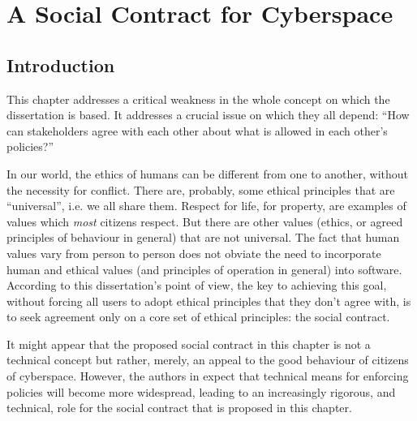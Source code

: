 \chapter{A Social Contract for Cyberspace}
\section{Introduction}
This chapter addresses a critical
weakness in the whole concept on which the dissertation is based. It
addresses a crucial issue on which they all depend: ``How can stakeholders
agree with each other about what is allowed in each other's policies?''

In our world, the ethics of humans can be different from one to another,
without the necessity for conflict. There are, probably, some ethical
principles that are ``universal'', i.e. we all share them. Respect for life, for property, are examples of values which {\em most} citizens respect. But there are other values (ethics, or agreed principles of behaviour in general) 
that are not universal. The fact that human values vary from person to person does not obviate
the need to incorporate human and ethical values (and principles
of operation in general) into software. According to this dissertation's point of view, the
key to achieving this goal, without forcing all users to adopt ethical
principles that they don't agree with, is to seek agreement only on a
core set of ethical principles: the social contract.

It might appear that the proposed social contract in this chapter is not a
technical concept but rather, merely, an appeal to the good behaviour of
citizens of cyberspace. However, the authors in \cite{sheniar2021social}
expect that technical means for enforcing policies will become more
widespread, leading to \iffalse an increasingly rigorous, and technical, role
for the social contract\fi an increasingly rigorous, and technical, role for the social contract that is proposed in this chapter. 

